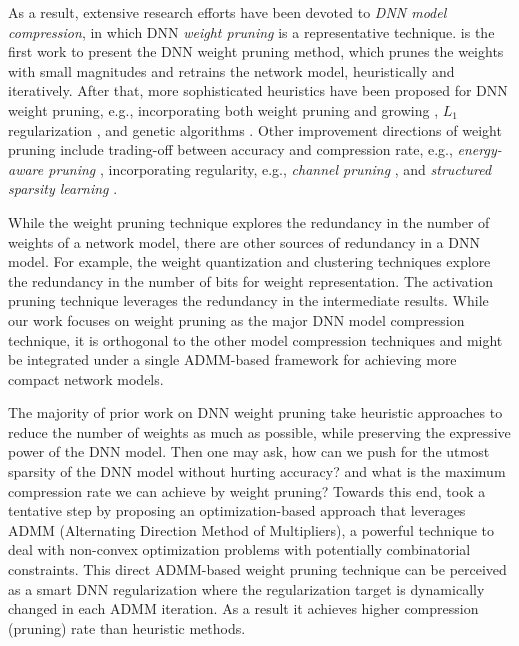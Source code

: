 \documentclass{article} %
\begin{document}
As a result, extensive research efforts have been devoted to \emph{DNN model compression}, in which DNN \emph{weight pruning} is a representative technique.
\citet{han2015learning} is the first work to present the DNN weight pruning method, which prunes the weights with small magnitudes and retrains the network model, heuristically and iteratively. 
After that, more sophisticated heuristics have been proposed for DNN weight pruning, e.g., incorporating both weight pruning and growing \citep{guo2016dynamic}, $L_1$ regularization \citep{wen2016learning}, and genetic algorithms \citep{dai2017nest}.
Other improvement directions of weight pruning include trading-off between accuracy and compression rate, e.g., \emph{energy-aware pruning} \citep{yang2017designing}, incorporating regularity, e.g., \emph{channel pruning} \citep{he2017channel}, and \emph{structured sparsity learning} \citep{wen2016learning}.

 

While the weight pruning technique explores the redundancy in the number of weights of a network model, there are other sources of redundancy in a DNN model. For example, the weight quantization \citep{leng2017extremely,park2017weighted,zhou2017incremental,lin2016fixed,wu2016quantized,rastegari2016xnor,hubara2016binarized,courbariaux2015binaryconnect} and clustering \citep{zhu2017trained,han2015deep} techniques explore the redundancy in the number of bits for weight representation.
The activation pruning technique \citep{jung2018joint,sharify2018loom} leverages the redundancy in the intermediate results. %
While our work focuses on weight pruning as the major DNN model compression technique, it is orthogonal to the other model compression techniques and might be integrated under a single ADMM-based framework for achieving more compact network models.

The majority of prior work on DNN weight pruning take heuristic approaches to reduce the number of weights as much as possible, while preserving the expressive power of the DNN model.
Then one may ask, how can we push for the utmost sparsity of the DNN model without hurting accuracy? and what is the maximum compression rate we can achieve by weight pruning?
Towards this end, \citet{zhang2018systematic} took a tentative step by proposing an optimization-based approach that leverages ADMM (Alternating Direction Method of Multipliers), a powerful technique to deal with non-convex optimization problems with potentially combinatorial constraints. This direct ADMM-based weight pruning technique can be perceived as a smart DNN regularization where the regularization target is dynamically changed in each ADMM iteration. As a result it achieves higher compression (pruning) rate than heuristic methods.
\end{document}
